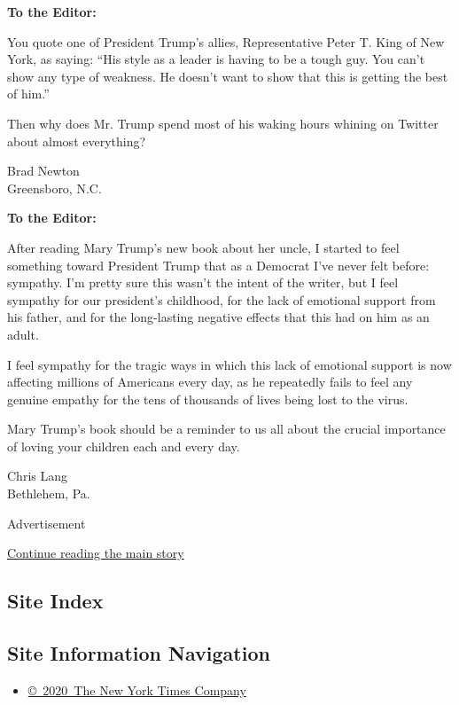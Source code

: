 \textbf{To the Editor:}

You quote one of President Trump's allies, Representative Peter T. King
of New York, as saying: ``His style as a leader is having to be a tough
guy. You can't show any type of weakness. He doesn't want to show that
this is getting the best of him.''

Then why does Mr. Trump spend most of his waking hours whining on
Twitter about almost everything?

Brad Newton\\
Greensboro, N.C.

\textbf{To the Editor:}

After reading Mary Trump's new book about her uncle, I started to feel
something toward President Trump that as a Democrat I've never felt
before: sympathy. I'm pretty sure this wasn't the intent of the writer,
but I feel sympathy for our president's childhood, for the lack of
emotional support from his father, and for the long-lasting negative
effects that this had on him as an adult.

I feel sympathy for the tragic ways in which this lack of emotional
support is now affecting millions of Americans every day, as he
repeatedly fails to feel any genuine empathy for the tens of thousands
of lives being lost to the virus.

Mary Trump's book should be a reminder to us all about the crucial
importance of loving your children each and every day.

Chris Lang\\
Bethlehem, Pa.

Advertisement

\protect\hyperlink{after-bottom}{Continue reading the main story}

\hypertarget{site-index}{%
\subsection{Site Index}\label{site-index}}

\hypertarget{site-information-navigation}{%
\subsection{Site Information
Navigation}\label{site-information-navigation}}

\begin{itemize}
\tightlist
\item
  \href{https://help.nytimes3xbfgragh.onion/hc/en-us/articles/115014792127-Copyright-notice}{©~2020~The
  New York Times Company}
\end{itemize}

